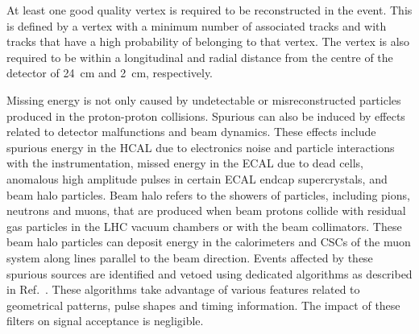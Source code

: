 At least one good quality vertex is required to be reconstructed in the event. 
This is defined by a vertex with a minimum number of associated tracks and with 
tracks that have a high probability of belonging to that vertex. The vertex is 
also required to be within a longitudinal and radial distance from the centre 
of the detector of 24~cm and 2~cm, respectively.

Missing energy is not only caused by undetectable or misreconstructed particles 
produced in the proton-proton collisions. Spurious \met can also be induced by 
effects related to detector malfunctions and beam dynamics. These effects 
include spurious energy in the HCAL due to electronics noise and particle 
interactions with the instrumentation, missed energy in the ECAL due to dead 
cells, anomalous high amplitude pulses in certain ECAL endcap supercrystals, 
and beam halo particles. Beam halo refers to the showers of particles, 
including pions, neutrons and muons, that are produced when beam protons 
collide with residual gas particles in the LHC vacuum chambers or with the beam 
collimators. These beam halo particles can deposit energy in the calorimeters 
and CSCs of the muon system along lines parallel to the beam direction.
Events affected by these spurious \met sources are identified and vetoed using 
dedicated algorithms as described in Ref.~\cite{met-filters-16}. These 
algorithms take advantage of various features related to geometrical patterns, 
pulse shapes and timing information. The impact of these filters on signal 
acceptance is negligible.

